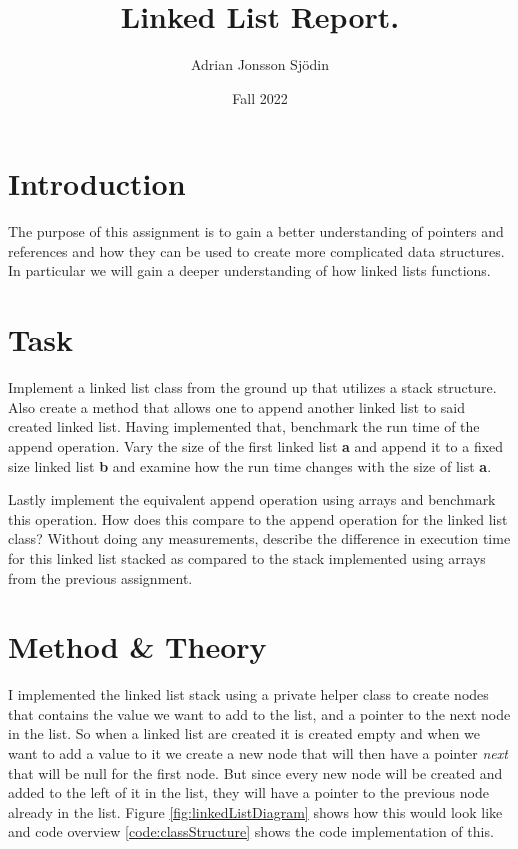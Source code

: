 \documentclass[a4paper,11pt]{article}
\begin{document}
\title{
    \textbf{Linked List Report.}
}
\author{Adrian Jonsson Sjödin}
\date{Fall 2022}

\maketitle

\section*{Introduction}
The purpose of this assignment is to gain a better understanding of pointers and references
and how they can be used to create more complicated data structures. In particular we will
gain a deeper understanding of how linked lists functions.

\section*{Task}
Implement a linked list class from the ground up that utilizes a stack structure. Also
create a method that allows one to append another linked list to said created linked list.
Having implemented that, benchmark the run time of the append operation. Vary the size of the
first linked list \textbf{a} and append it to a fixed size linked list \textbf{b} and
examine how the run time changes with the size of list \textbf{a}.

Lastly implement the equivalent append operation using arrays and benchmark this operation.
How does this compare to the append operation for the linked list class? Without doing any measurements, 
describe the difference in execution time for this linked list stacked as compared to the stack implemented 
using arrays from the previous assignment.

\section*{Method \& Theory}
I implemented the linked list stack using a private helper class to create nodes that contains the value 
we want to add to the list, and a pointer to the next node in the list. So when a linked list are created 
it is created empty and when we want to add a value to it we create a new node that will then have a pointer
\textit{next} that will be null for the first node. But since every new node will be created and added to the 
left of it in the list, they will have a pointer to the previous node already in the list. Figure 
\ref{fig:linkedListDiagram} shows how this would look like and code overview \ref{code:classStructure} shows the code implementation
of this.
\end{document}
